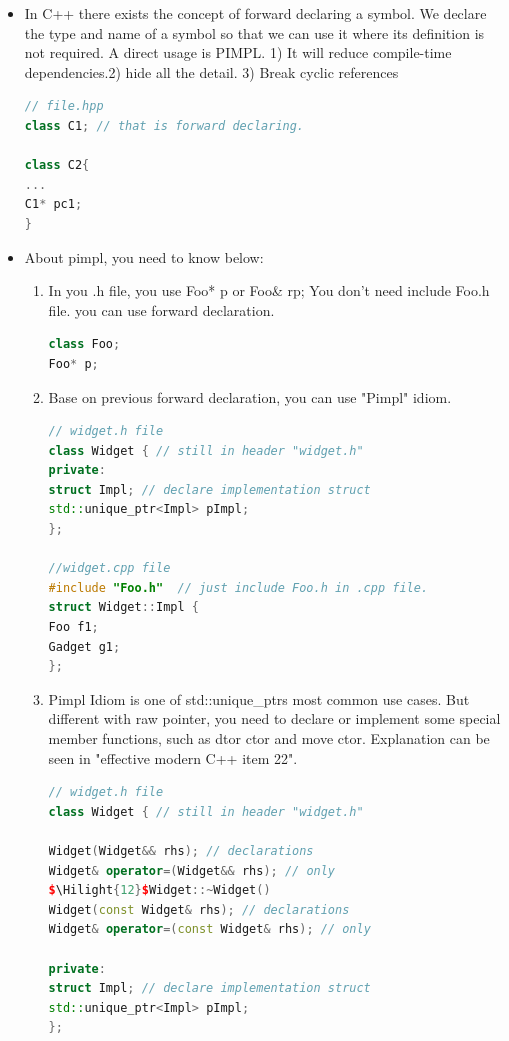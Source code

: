 \documentclass[a4paper,12pt,twoside]{book}
\newcommand{\Hilight}[1]{\makebox[0pt][l]{\color{yellow}\rule[-3pt]{#1em}{11pt}}}
\begin{document}
\begin{itemize}
\item In C++ there exists the concept of forward declaring a symbol. We declare the type and name of a symbol so that we can use it where its definition is not required. A direct usage is PIMPL. 1) It will reduce compile-time dependencies.2) hide all the detail. 3) Break cyclic references
\begin{lstlisting}[frame=single, language=c++]
// file.hpp
class C1; // that is forward declaring.

class C2{
...
C1* pc1;
}
\end{lstlisting}

\item About pimpl, you need to know below:

\begin{enumerate}

\item In you .h file, you use Foo* p or Foo\& rp; You don't need include Foo.h file. you can use forward declaration.
\begin{lstlisting}[frame=single, language=c++]
class Foo;
Foo* p;
\end{lstlisting}

\item Base on previous forward declaration, you can use "Pimpl" idiom.
\begin{lstlisting}[frame=single, language=c++]
// widget.h file
class Widget { // still in header "widget.h"
private:
struct Impl; // declare implementation struct
std::unique_ptr<Impl> pImpl;
};

//widget.cpp file
#include "Foo.h"  // just include Foo.h in .cpp file.
struct Widget::Impl {
Foo f1;
Gadget g1;
};
\end{lstlisting}


\item   Pimpl Idiom is one of std::unique\_ptrs most common use cases. But different with raw pointer,  you need to declare or implement some special member functions, such as dtor ctor and move ctor. Explanation can be seen in "effective modern C++ item 22". 
\begin{lstlisting}[frame=single, language=c++, mathescape=true]
// widget.h file
class Widget { // still in header "widget.h"

Widget(Widget&& rhs); // declarations
Widget& operator=(Widget&& rhs); // only
$\Hilight{12}$Widget::~Widget()
Widget(const Widget& rhs); // declarations
Widget& operator=(const Widget& rhs); // only

private:
struct Impl; // declare implementation struct
std::unique_ptr<Impl> pImpl;
};


\end{lstlisting}
\end{enumerate}
\end{itemize}
\end{document}

